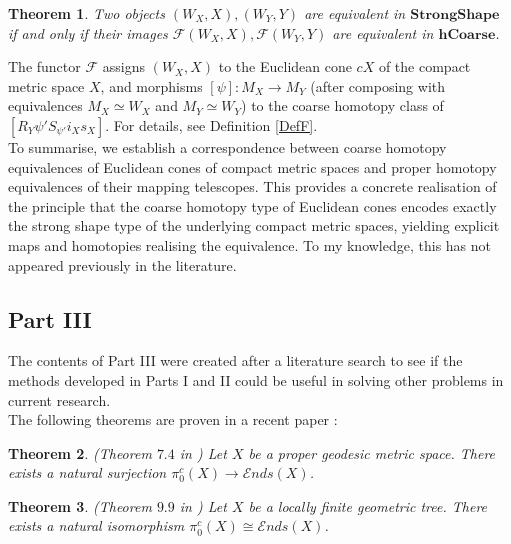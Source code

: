 \documentclass[a4paper,11pt]{article}
\theoremstyle{definition}
\theoremstyle{plain}
\newtheorem*{theorem*}{Theorem}
\theoremstyle{remark}
\begin{document}
\begin{theorem*} Two objects $(W_{X},X),(W_{Y},Y)$ are equivalent in $\mathbf{StrongShape}$ if and only if their images $\mathcal{F}(W_{X},X),\mathcal{F}(W_{Y},Y)$ are equivalent in $\mathbf{hCoarse}$. 
\end{theorem*}

The functor $\mathcal{F}$ assigns $(W_{X},X)$ to the Euclidean cone $cX$ of the compact metric space $X$, and morphisms $[\psi]: M_{X}\rightarrow M_{Y}$ (after composing with equivalences $M_{X}\simeq W_{X}$ and $M_{Y}\simeq W_{Y}$) to the coarse homotopy class of $[R_{Y}\psi' S_{\psi'} i_{X} s_{X}]$. For details, see Definition \ref{DefF}.\\

To summarise, we establish a correspondence between coarse homotopy equivalences of Euclidean cones of compact metric spaces and proper homotopy equivalences of their mapping telescopes. This provides a concrete realisation of the principle that the coarse homotopy type of Euclidean cones encodes exactly the strong shape type of the underlying compact metric spaces, yielding explicit maps and homotopies realising the equivalence. To my knowledge, this has not appeared previously in the literature.\\

\subsection{Part III}

The contents of Part III were created after a literature search to see if the methods developed in Parts I and II could be useful in solving other problems in current research. \\

The following theorems are proven in a recent paper \cite{ashley2025interactions}:

\begin{theorem*} (Theorem $7.4$ in \cite{ashley2025interactions}) Let $X$ be a proper geodesic metric space. There exists a natural surjection $\pi^c_{0}(X)\rightarrow \mathcal{E}nds(X)$. 
\end{theorem*}

\begin{theorem*} (Theorem $9.9$ in \cite{ashley2025interactions}) Let $X$ be a locally finite geometric tree. There exists a natural isomorphism $\pi^c_{0}(X)\cong \mathcal{E}nds(X)$.
\end{theorem*}
\end{document}
